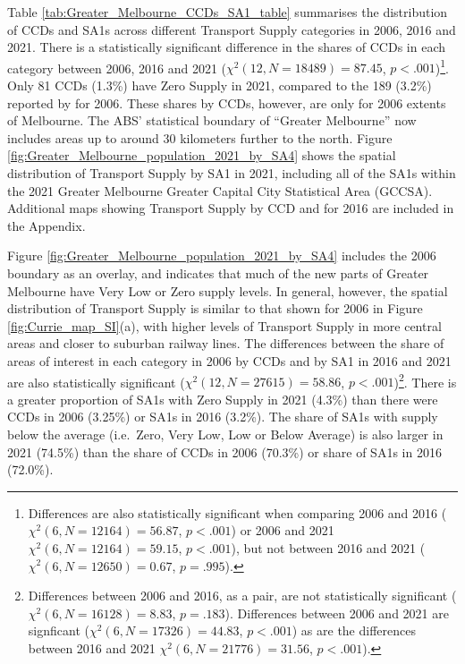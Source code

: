 \documentclass[preprint, 3p,
authoryear]{elsarticle} %
\begin{document}
Table \ref{tab:Greater_Melbourne_CCDs_SA1_table} summarises the
distribution of CCDs and SA1s across different Transport Supply
categories in 2006, 2016 and 2021. There is a statistically significant
difference in the shares of CCDs in each category between 2006, 2016 and
2021 (\(\chi^2(12, N = 18489) = 87.45\), \(p < .001\))\footnote{Differences
  are also statistically significant when comparing 2006 and 2016
  (\(\chi^2(6, N = 12164) = 56.87\), \(p < .001\)) or 2006 and 2021
  \(\chi^2(6, N = 12164) = 59.15\), \(p < .001\)), but not between 2016
  and 2021 (\(\chi^2(6, N = 12650) = 0.67\), \(p = .995\)).}. Only 81
CCDs (1.3\%) have Zero Supply in 2021, compared to the 189 (3.2\%)
reported by \citet{currie2010identifying} for 2006. These shares by
CCDs, however, are only for 2006 extents of Melbourne. The ABS'
statistical boundary of ``Greater Melbourne'' now includes areas up to
around 30 kilometers further to the north. Figure
\ref{fig:Greater_Melbourne_population_2021_by_SA4} shows the spatial
distribution of Transport Supply by SA1 in 2021, including all of the
SA1s within the 2021 Greater Melbourne Greater Capital City Statistical
Area (GCCSA). Additional maps showing Transport Supply by CCD and for
2016 are included in the Appendix.

Figure \ref{fig:Greater_Melbourne_population_2021_by_SA4} includes the
2006 boundary as an overlay, and indicates that much of the new parts of
Greater Melbourne have Very Low or Zero supply levels. In general,
however, the spatial distribution of Transport Supply is similar to that
shown for 2006 in Figure \ref{fig:Currie_map_SI}(a), with higher levels
of Transport Supply in more central areas and closer to suburban railway
lines. The differences between the share of areas of interest in each
category in 2006 by CCDs and by SA1 in 2016 and 2021 are also
statistically significant (\(\chi^2(12, N = 27615) = 58.86\),
\(p < .001\))\footnote{Differences between 2006 and 2016, as a pair, are
  not statistically significant (\(\chi^2(6, N = 16128) = 8.83\),
  \(p = .183\)). Differences between 2006 and 2021 are signficant
  (\(\chi^2(6, N = 17326) = 44.83\), \(p < .001\)) as are the
  differences between 2016 and 2021 \(\chi^2(6, N = 21776) = 31.56\),
  \(p < .001\)).}. There is a greater proportion of SA1s with Zero
Supply in 2021 (4.3\%) than there were CCDs in 2006 (3.25\%) or SA1s in
2016 (3.2\%). The share of SA1s with supply below the average
(i.e.~Zero, Very Low, Low or Below Average) is also larger in 2021
(74.5\%) than the share of CCDs in 2006 (70.3\%) or share of SA1s in
2016 (72.0\%).
\end{document}
